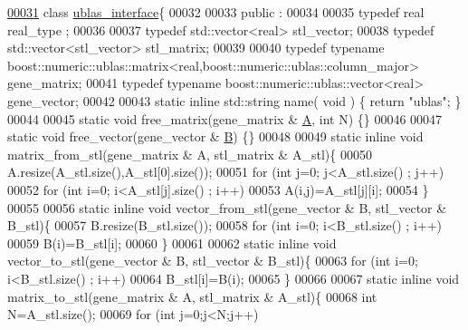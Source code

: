 \begin{DoxyCode}
\hyperlink{classublas__interface}{00031} \textcolor{keyword}{class }\hyperlink{classublas__interface}{ublas\_interface}\{
00032 
00033 public :
00034 
00035   \textcolor{keyword}{typedef} real real\_type ;
00036 
00037   \textcolor{keyword}{typedef} std::vector<real> stl\_vector;
00038   \textcolor{keyword}{typedef} std::vector<stl\_vector> stl\_matrix;
00039 
00040   \textcolor{keyword}{typedef} \textcolor{keyword}{typename} boost::numeric::ublas::matrix<real,boost::numeric::ublas::column\_major> gene\_matrix;
00041   \textcolor{keyword}{typedef} \textcolor{keyword}{typename} boost::numeric::ublas::vector<real> gene\_vector;
00042 
00043   \textcolor{keyword}{static} \textcolor{keyword}{inline} std::string name( \textcolor{keywordtype}{void} ) \{ \textcolor{keywordflow}{return} \textcolor{stringliteral}{"ublas"}; \}
00044 
00045   \textcolor{keyword}{static} \textcolor{keywordtype}{void} free\_matrix(gene\_matrix & \hyperlink{group___core___module_class_eigen_1_1_matrix}{A}, \textcolor{keywordtype}{int} N) \{\}
00046 
00047   \textcolor{keyword}{static} \textcolor{keywordtype}{void} free\_vector(gene\_vector & \hyperlink{group___core___module_class_eigen_1_1_matrix}{B}) \{\}
00048 
00049   \textcolor{keyword}{static} \textcolor{keyword}{inline} \textcolor{keywordtype}{void} matrix\_from\_stl(gene\_matrix & A, stl\_matrix & A\_stl)\{
00050     A.resize(A\_stl.size(),A\_stl[0].size());
00051     \textcolor{keywordflow}{for} (\textcolor{keywordtype}{int} j=0; j<A\_stl.size() ; j++)
00052       \textcolor{keywordflow}{for} (\textcolor{keywordtype}{int} i=0; i<A\_stl[j].size() ; i++)
00053         A(i,j)=A\_stl[j][i];
00054   \}
00055 
00056   \textcolor{keyword}{static} \textcolor{keyword}{inline} \textcolor{keywordtype}{void} vector\_from\_stl(gene\_vector & B, stl\_vector & B\_stl)\{
00057     B.resize(B\_stl.size());
00058     \textcolor{keywordflow}{for} (\textcolor{keywordtype}{int} i=0; i<B\_stl.size() ; i++)
00059       B(i)=B\_stl[i];
00060   \}
00061 
00062   \textcolor{keyword}{static} \textcolor{keyword}{inline} \textcolor{keywordtype}{void} vector\_to\_stl(gene\_vector & B, stl\_vector & B\_stl)\{
00063     \textcolor{keywordflow}{for} (\textcolor{keywordtype}{int} i=0; i<B\_stl.size() ; i++)
00064       B\_stl[i]=B(i);
00065   \}
00066 
00067   \textcolor{keyword}{static} \textcolor{keyword}{inline} \textcolor{keywordtype}{void} matrix\_to\_stl(gene\_matrix & A, stl\_matrix & A\_stl)\{
00068     \textcolor{keywordtype}{int} N=A\_stl.size();
00069     \textcolor{keywordflow}{for} (\textcolor{keywordtype}{int} j=0;j<N;j++)

\end{DoxyCode}
